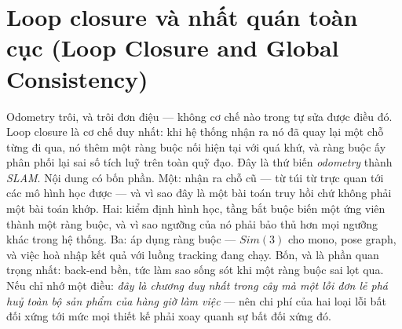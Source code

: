 \documentclass[../../vslam.tex]{subfiles}
\begin{document}
\chapter{Loop closure và nhất quán toàn cục (Loop Closure and Global Consistency)}

\begin{tomtat}
Odometry trôi, và trôi đơn điệu --- không cơ chế nào trong  tự sửa được điều đó. Loop closure là cơ chế duy nhất: khi hệ thống nhận ra nó đã quay lại một chỗ từng đi qua, nó thêm một ràng buộc nối hiện tại với quá khứ, và ràng buộc ấy phân phối lại sai số tích luỹ trên toàn quỹ đạo. Đây là thứ biến \emph{odometry} thành \emph{SLAM}. Nội dung có bốn phần. Một: nhận ra chỗ cũ --- từ túi từ trực quan tới các mô hình học được --- và vì sao đây là một bài toán truy hồi chứ không phải một bài toán khớp. Hai: kiểm định hình học, tầng bắt buộc biến một ứng viên thành một ràng buộc, và vì sao ngưỡng của nó phải bảo thủ hơn mọi ngưỡng khác trong hệ thống. Ba: áp dụng ràng buộc --- \(Sim(3)\) cho mono, pose graph, và việc hoà nhập kết quả với luồng tracking đang chạy. Bốn, và là phần quan trọng nhất: back-end bền, tức làm sao sống sót khi một ràng buộc sai lọt qua. Nếu chỉ nhớ một điều: \emph{đây là chương duy nhất trong cây mà một lỗi đơn lẻ phá huỷ toàn bộ sản phẩm của hàng giờ làm việc} --- nên chi phí của hai loại lỗi bất đối xứng tới mức mọi thiết kế phải xoay quanh sự bất đối xứng đó.
\end{tomtat}
\end{document}
